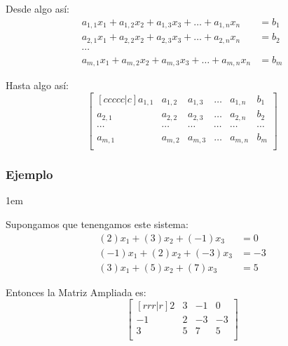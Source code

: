 \documentclass[12pt, fleqn]{report}                             %
\newenvironment{SmallIndentation}[1][0.75em]                    %
        {\begin{adjustwidth}{#1}{}\begin{footnotesize}}             %
        {\end{footnotesize}\end{adjustwidth}}                       %
\theoremstyle{break}                                            %
\begin{document}
                Desde algo así:
                \begin{align*}
                    a_{1,1}x_1 + a_{1,2}x_2 + a_{1,3}x_3 + \dots + a_{1,n}x_n &= b_1    \\
                    a_{2,1}x_1 + a_{2,2}x_2 + a_{2,3}x_3 + \dots + a_{2,n}x_n &= b_2    \\
                    \cdots                                                              \\
                    a_{m,1}x_1 + a_{m,2}x_2 + a_{m,3}x_3 + \dots + a_{m,n}x_n &= b_m
                \end{align*}

                Hasta algo así:
                \begin{equation*}
                    \begin{bmatrix}[ccccc|c]
                        a_{1,1} & a_{1,2} & a_{1,3} & \dots  & a_{1,n} & b_1     \\
                        a_{2,1} & a_{2,2} & a_{2,3} & \dots  & a_{2,n} & b_2     \\
                        \cdots  & \cdots  & \cdots  & \cdots & \cdots  & \cdots  \\
                        a_{m,1} & a_{m,2} & a_{m,3} & \dots  & a_{m,n} & b_m     \\
                    \end{bmatrix}
                \end{equation*}


                \subsubsection{Ejemplo}
                \begin{SmallIndentation}[1em]
                    
                    Supongamos que tenengamos este sistema:
                    \begin{align*}
                        (2)x_1  +  (3)x_2 + (-1)x_3 &= 0    \\
                        (-1)x_1 +  (2)x_2 + (-3)x_3 &= -3   \\
                        (3)x_1  +  (5)x_2 + (7)x_3  &= 5    
                    \end{align*}

                    Entonces la Matriz Ampliada es:
                    \begin{equation*}
                        \begin{bmatrix}[rrr|r]
                            2  & 3 & -1 & 0  \\
                            -1 & 2 & -3 & -3 \\
                            3  & 5 & 7  & 5  \\
                        \end{bmatrix}
                    \end{equation*}

                \end{SmallIndentation}
\end{document}
